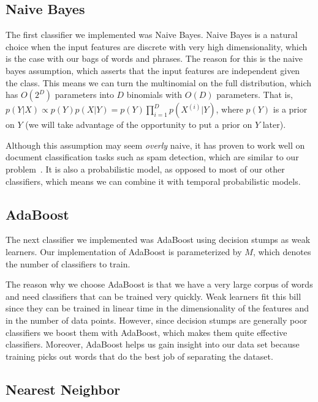 \documentclass[10pt, twocolumn]{article}
\begin{document}
\subsection{Naive Bayes}
\label{sec:naive-bayes}

The first classifier we implemented was Naive Bayes.
Naive Bayes is a natural choice when the input features are discrete with very high dimensionality, which is the case with our bags of words and phrases.
The reason for this is the naive bayes assumption, which asserts that the input features are independent given the class.
This means we can turn the multinomial on the full distribution, which has $O(2^D)$ parameters into $D$ binomials with $O(D)$ parameters.
That is, $p(Y|X) \propto p(Y)p(X|Y) = p(Y)\prod_{i=1}^{D}{p(X^{(i)}|Y)}$, where $p(Y)$ is a prior on $Y$ (we will take advantage of the opportunity to put a prior on $Y$ later).

Although this assumption may seem \emph{overly} naive, it has proven to work well on document classification tasks such as spam detection, which are similar to our problem~\cite{spam}.
It is also a probabilistic model, as opposed to most of our other classifiers, which means we can combine it with temporal probabilistic models.

\subsection{AdaBoost}
\label{sec:adaboost}

The next classifier we implemented was AdaBoost using decision stumps as weak learners.
Our implementation of AdaBoost is parameterized by $M$, which denotes the number of classifiers to train.

The reason why we choose AdaBoost is that we have a very large corpus of words and need classifiers that can be trained very quickly.
Weak learners fit this bill since they can be trained in linear time in the dimensionality of the features and in the number of data points.
However, since decision stumps are generally poor classifiers we boost them with AdaBoost, which makes them quite effective classifiers.
Moreover, AdaBoost helps us gain insight into our data set because training picks out words that do the best job of separating the dataset.

\subsection{Nearest Neighbor}
\label{sec:nearest-neighbor}
\end{document}
